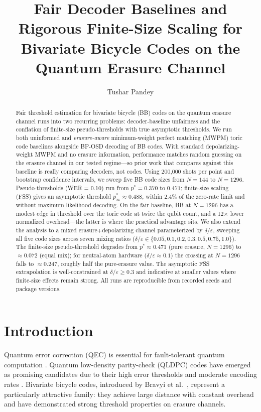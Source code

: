 \documentclass[a4paper]{quantumarticle}
\title{Fair Decoder Baselines and Rigorous Finite-Size Scaling for Bivariate Bicycle Codes on the Quantum Erasure Channel}
\author{Tushar Pandey}
\affiliation{Department of Electrical \& Computer Engineering, Texas A\&M University, College Station, TX 77843, USA}
\date{}
\begin{document}
\maketitle

\begin{abstract}
Fair threshold estimation for bivariate bicycle (BB) codes on the quantum erasure channel
runs into two recurring problems: decoder-baseline unfairness and the conflation of
finite-size pseudo-thresholds with true asymptotic thresholds.
We run both uninformed and \emph{erasure-aware} minimum-weight perfect matching (MWPM)
toric code baselines alongside BP-OSD decoding of BB codes.
With standard depolarizing-weight MWPM and no erasure information, performance matches
random guessing on the erasure channel in our tested regime---so prior work that compares
against this baseline is really comparing decoders, not codes.
Using 200{,}000 shots per point and bootstrap confidence intervals, we sweep five BB code
sizes from $N=144$ to $N=1296$.
Pseudo-thresholds (WER = 0.10) run from $p^* = 0.370$ to $0.471$; finite-size scaling
(FSS) gives an asymptotic threshold $p^*_\infty \approx 0.488$, within 2.4\% of the
zero-rate limit and without maximum-likelihood decoding.
On the fair baseline, BB at $N=1296$ has a modest edge in threshold over the toric code
at twice the qubit count, and a 12$\times$ lower normalized overhead---the latter is
where the practical advantage sits.
We also extend the analysis to a mixed erasure+depolarizing channel parameterized by
$\delta/\varepsilon$, sweeping all five code sizes across seven mixing ratios
($\delta/\varepsilon \in \{0.05, 0.1, 0.2, 0.3, 0.5, 0.75, 1.0\}$).
The finite-size pseudo-threshold degrades from $p^* \approx 0.471$ (pure erasure, $N{=}1296$)
to $\approx 0.072$ (equal mix); for neutral-atom hardware ($\delta/\varepsilon \approx 0.1$)
the crossing at $N = 1296$ falls to $\approx 0.247$, roughly half the pure-erasure value.
The asymptotic FSS extrapolation is well-constrained at $\delta/\varepsilon \geq 0.3$ and
indicative at smaller values where finite-size effects remain strong.
All runs are reproducible from recorded seeds and package versions.
\end{abstract}

\section{Introduction}

Quantum error correction (QEC) is essential for fault-tolerant quantum computation
\cite{nielsen2010quantum, gottesman1997stabilizer}.
Quantum low-density parity-check (QLDPC) codes have emerged as promising candidates due to
their high error thresholds and moderate encoding rates
\cite{bravyi2024high, tillich2014quantum, kovalev2013improved}.
Bivariate bicycle codes, introduced by Bravyi et al.\ \cite{bravyi2024high}, represent a
particularly attractive family: they achieve large distance with constant overhead and have
demonstrated strong threshold properties on erasure channels.
\end{document}
